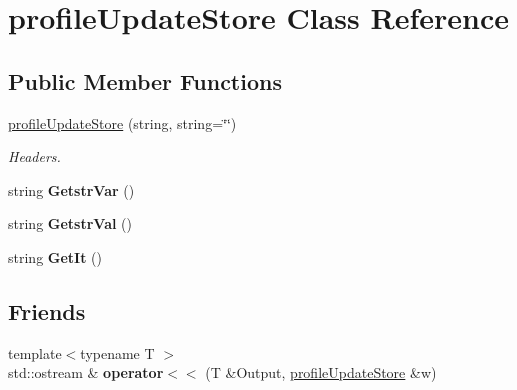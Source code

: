 \hypertarget{classprofileUpdateStore}{
\section{profileUpdateStore Class Reference}
\label{classprofileUpdateStore}
}
\subsection*{Public Member Functions}
\begin{DoxyCompactItemize}
\item 
\hyperlink{classprofileUpdateStore_a9befa25c24c51e242860b4460a08a6d0}{profileUpdateStore} (string, string=\char`\"{}\char`\"{})
\begin{DoxyCompactList}\small\item\em Headers. \item\end{DoxyCompactList}\item 
\hypertarget{classprofileUpdateStore_a94271f240ff424d82930be10d60aa5ad}{
string {\bfseries GetstrVar} ()}
\label{classprofileUpdateStore_a94271f240ff424d82930be10d60aa5ad}

\item 
\hypertarget{classprofileUpdateStore_aa47104a802ef830830c7009c039c58b1}{
string {\bfseries GetstrVal} ()}
\label{classprofileUpdateStore_aa47104a802ef830830c7009c039c58b1}

\item 
\hypertarget{classprofileUpdateStore_ac534c3f7c719434f31e350443c6c783f}{
string {\bfseries GetIt} ()}
\label{classprofileUpdateStore_ac534c3f7c719434f31e350443c6c783f}

\end{DoxyCompactItemize}
\subsection*{Friends}
\begin{DoxyCompactItemize}
\item 
\hypertarget{classprofileUpdateStore_affc9878690c5c32b164325be5ebe0278}{
{\footnotesize template$<$typename T $>$ }\\std::ostream \& {\bfseries operator$<$$<$} (T \&Output, \hyperlink{classprofileUpdateStore}{profileUpdateStore} \&w)}
\label{classprofileUpdateStore_affc9878690c5c32b164325be5ebe0278}

\end{DoxyCompactItemize}


